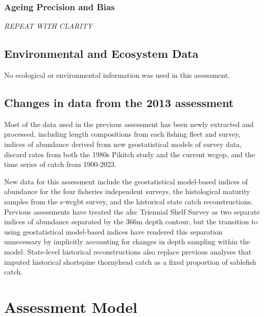 \documentclass[11pt,
  english,
  letterpaper,
]{article}
\begin{document}
\hypertarget{ageing-precision-and-bias}{%
\subsubsection{Ageing Precision and Bias}\label{ageing-precision-and-bias}}

\emph{REPEAT WITH CLARITY}

\hypertarget{environmental-and-ecosystem-data}{%
\subsection{Environmental and Ecosystem Data}\label{environmental-and-ecosystem-data}}

No ecological or environmental information was used in this assessment.

\hypertarget{changes-in-data-from-the-2013-assessment}{%
\subsection{Changes in data from the 2013 assessment}\label{changes-in-data-from-the-2013-assessment}}

Most of the data used in the previous assessment has been newly extracted and processed, including length compositions from each fishing fleet and survey, indices of abundance derived from new geostatistical models of survey data, discard rates from both the 1980s Pikitch study and the current \gls{wcgop}, and the time series of catch from 1900-2023.

New data for this assessment include the geostatistical model-based indices of abundance for the four fisheries independent surveys, the histological maturity samples from the \gls {s-wcgbt} survey, and the historical state catch reconstructions. Previous assessments have treated the \gls{afsc} Triennial Shelf Survey as two separate indices of abundance separated by the 366m depth contour, but the transition to using geostatistical model-based indices have rendered this separation unnecessary by implicitly accounting for changes in depth sampling within the model. State-level historical reconstructions also replace previous analyses that imputed historical shortspine thornyhead catch as a fixed proportion of sablefish catch.

\hypertarget{assessment-model}{%
\section{Assessment Model}\label{assessment-model}}
\end{document}

